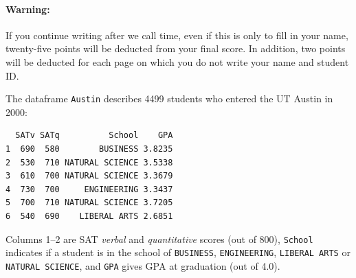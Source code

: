 \documentclass[addpoints,12pt]{exam}
\begin{document}
\paragraph{Warning:} If you continue writing after we call time, even if this is only to fill in your name, twenty-five points will be deducted from your final score. In addition, two points will be deducted for each page on which you do not write your name and student ID. 

\newpage
\begin{questions}

  \question The dataframe \texttt{Austin} describes 4499 students who entered the UT Austin in 2000:
  \small
\begin{verbatim}
  SATv SATq          School    GPA
1  690  580        BUSINESS 3.8235
2  530  710 NATURAL SCIENCE 3.5338
3  610  700 NATURAL SCIENCE 3.3679
4  730  700     ENGINEERING 3.3437
5  700  710 NATURAL SCIENCE 3.7205
6  540  690    LIBERAL ARTS 2.6851
\end{verbatim}
\normalsize
Columns 1--2 are SAT \emph{verbal} and \emph{quantitative} scores (out of 800), \texttt{School} indicates if a student is in the school of \texttt{BUSINESS}, \texttt{ENGINEERING}, \texttt{LIBERAL ARTS} or \texttt{NATURAL SCIENCE}, and \texttt{GPA} gives GPA at graduation (out of 4.0).
\begin{parts}

\end{parts}
\end{questions}
\end{document}
